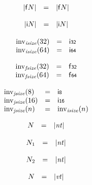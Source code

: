 $$
\begin{array}[t]{@{}lcl@{}l@{}}
{|{\mathsf{f}}{N}|} & = & {|{\mathsf{f}}{N}|} \\
\end{array}
$$

$$
\begin{array}[t]{@{}lcl@{}l@{}}
{|{\mathsf{i}}{N}|} & = & {|{\mathsf{i}}{N}|} \\
\end{array}
$$

$$
\begin{array}[t]{@{}lcl@{}l@{}}
{\mathrm{inv}}_{\mathit{isize}}(32) & = & \mathsf{i{\scriptstyle 32}} \\
{\mathrm{inv}}_{\mathit{isize}}(64) & = & \mathsf{i{\scriptstyle 64}} \\
\end{array}
$$

$$
\begin{array}[t]{@{}lcl@{}l@{}}
{\mathrm{inv}}_{\mathit{fsize}}(32) & = & \mathsf{f{\scriptstyle 32}} \\
{\mathrm{inv}}_{\mathit{fsize}}(64) & = & \mathsf{f{\scriptstyle 64}} \\
\end{array}
$$

$$
\begin{array}[t]{@{}lcl@{}l@{}}
{\mathrm{inv}}_{\mathit{jsize}}(8) & = & \mathsf{i{\scriptstyle 8}} \\
{\mathrm{inv}}_{\mathit{jsize}}(16) & = & \mathsf{i{\scriptstyle 16}} \\
{\mathrm{inv}}_{\mathit{jsize}}(n) & = & {\mathrm{inv}}_{\mathit{isize}}(n) \\
\end{array}
$$

$$
\begin{array}[t]{@{}lcl@{}l@{}}
N & = & {|{\mathit{nt}}|} \\
\end{array}
$$

$$
\begin{array}[t]{@{}lcl@{}l@{}}
N_1 & = & {|{\mathit{nt}}|} \\
\end{array}
$$

$$
\begin{array}[t]{@{}lcl@{}l@{}}
N_2 & = & {|{\mathit{nt}}|} \\
\end{array}
$$

$$
\begin{array}[t]{@{}lcl@{}l@{}}
N & = & {|{\mathit{vt}}|} \\
\end{array}
$$

